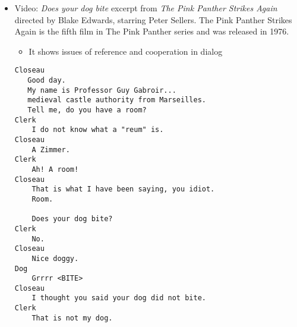 \documentclass[headrule,footrule]{foils}
\begin{document}
\MyLogo{}
\begin{itemize}
 \item Video: \textit{Does your dog bite} excerpt from \textit{The Pink Panther Strikes Again} directed by Blake Edwards, starring Peter Sellers.  The Pink Panther Strikes Again is the fifth film in The Pink Panther series and was released in 1976.
   \begin{itemize}
   \item It shows issues of reference and cooperation in dialog
   \end{itemize}
   \begin{small}
\begin{verbatim}
Closeau
   Good day.
   My name is Professor Guy Gabroir...
   medieval castle authority from Marseilles.
   Tell me, do you have a room?
Clerk
    I do not know what a "reum" is.
Closeau
    A Zimmer.
Clerk
    Ah! A room!
Closeau
    That is what I have been saying, you idiot.
    Room.

    Does your dog bite?
Clerk
    No.
Closeau
    Nice doggy.
Dog
    Grrrr <BITE>
Closeau
    I thought you said your dog did not bite.
Clerk
    That is not my dog.
\end{verbatim}
   \end{small}
 \end{itemize}

\small



\clearpage
\end{document}
